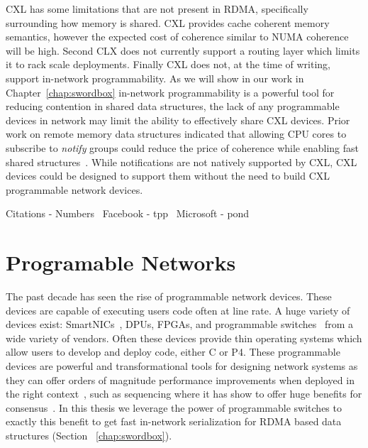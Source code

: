 \documentclass[12pt]{ucsddissertation}
\begin{document}
CXL has some limitations that are not present in RDMA, specifically surrounding how memory is
shared. CXL provides cache coherent memory semantics, however the expected cost of coherence similar
to NUMA coherence will be high. Second CLX does not currently support a routing layer which limits
it to rack scale deployments. Finally CXL does not, at the time of writing, support in-network
programmability. As we will show in our work in Chapter~\ref{chap:swordbox} in-network
programmability is a powerful tool for reducing contention in shared data structures, the lack of
any programmable devices in network may limit the ability to effectively share CXL devices. Prior
work on remote memory data structures indicated that allowing CPU cores to subscribe to
\textit{notify} groups could reduce the price of coherence while enabling fast shared
structures~\cite{aguilera2019designing}. While notifications are not natively supported by CXL, CXL
devices could be designed to support them without the need to build CXL programmable network
devices.


Citations - Numbers~\cite{cxl-demyst}
Facebook - tpp~\cite{tpp}
Microsoft - pond~\cite{pond}


\section{Programable Networks}

The past decade has seen the rise of programmable network devices. These devices are capable of
executing users code often at line rate. A huge variety of devices exist: SmartNICs~\cite{fairnic},
DPUs, FPGAs, and programmable switches~\cite{p4} from a wide variety of vendors. Often these devices
provide thin operating systems which allow users to develop and deploy code, either C or P4. These
programmable devices are powerful and transformational tools for designing network systems as they
can offer orders of magnitude performance improvements when deployed in the right
context~\cite{when-computer}, such as sequencing where it has show to offer huge benefits for
consensus~\cite{eris, nopaxos}. In this thesis we leverage the power of programmable switches to
exactly this benefit to get fast in-network serialization for RDMA based data structures (Section
~\ref{chap:swordbox}).
\end{document}
